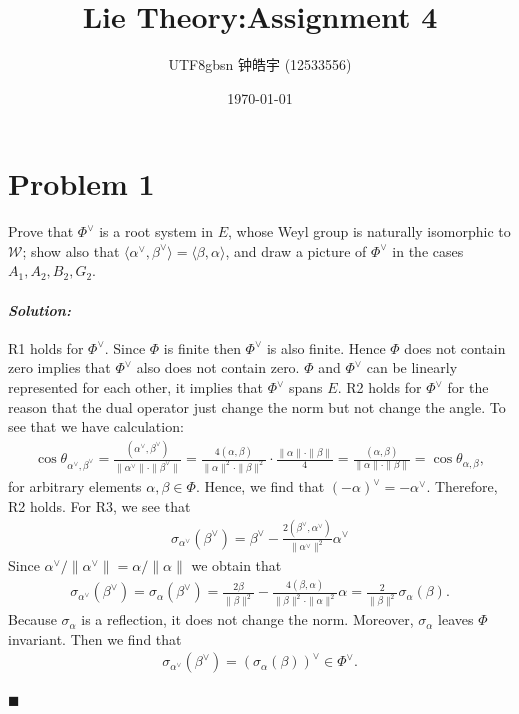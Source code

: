 \documentclass[12pt, a4paper]{article}
\title{Lie Theory:Assignment 4}
\author{
    \begin{CJK*}{UTF8}{gbsn}
    钟皓宇 (12533556)
    \end{CJK*}
}
\date{\today}
\newenvironment{solution}
  {\paragraph{\textit{Solution:}}\par\medskip}
  {\hfill$\blacksquare$\vspace{0.1cm}}
\begin{document}
\maketitle


\section*{Problem 1}
Prove that $\Phi^\vee$ is a root system in $E$, whose Weyl group is naturally isomorphic to $\mathcal{W}$; show also that $\langle \alpha^\vee, \beta^\vee \rangle = \langle \beta, \alpha \rangle$, and draw a picture of $\Phi^\vee$ in the cases $A_1, A_2, B_2, G_2$.
\begin{solution}
  R1 holds for $\Phi^\vee$.
  Since $\Phi$ is finite then $\Phi^\vee$ is also finite. Hence $\Phi$ does not contain zero implies that $\Phi^\vee$ also does not contain zero.
  $\Phi$ and $\Phi^\vee$ can be linearly represented for each other, it implies that $\Phi^\vee$ spans $E$.
  R2 holds for $\Phi^\vee$ for the reason that the dual operator just change the norm but not change the angle. To see that we have calculation:
  \begin{align*}
    \cos\theta_{\alpha^\vee,\beta^\vee}= \frac{(\alpha^\vee,\beta^\vee)}{\|\alpha^\vee\|\cdot \|\beta^\vee\|} = \frac{4(\alpha,\beta)}{\|\alpha\|^2\cdot \|\beta\|^2}\cdot \frac{\|\alpha\|\cdot \|\beta\|}{4} =\frac{(\alpha,\beta)}{\|\alpha\|\cdot \|\beta\|}=  \cos\theta_{\alpha,\beta},
  \end{align*}
  for arbitrary elements $\alpha,\beta\in \Phi$. Hence, we find that $(-\alpha)^\vee=-\alpha^\vee$.
  Therefore, R2 holds.
  For R3, we see that 
  \begin{align*}
    \sigma_{\alpha^\vee}(\beta^\vee) = \beta^\vee -\frac{2(\beta^\vee,\alpha^\vee)}{\|\alpha^\vee\|^2}\alpha^\vee 
  \end{align*}
  Since $\alpha^\vee/\|\alpha^\vee\|=\alpha/\|\alpha\|$ we obtain that 
  \begin{align*}
     \sigma_{\alpha^\vee}(\beta^\vee) = \sigma_{\alpha}(\beta^\vee)=\frac{2\beta}{\|\beta\|^2} - \frac{4(\beta,\alpha)}{\|\beta\|^2 \cdot \|\alpha\|^2} \alpha = \frac{2}{\|\beta\|^2}\sigma_{\alpha}(\beta).
  \end{align*}
  Because $\sigma_{\alpha}$ is a reflection, it does not change the norm. Moreover, $\sigma_\alpha$ leaves $\Phi$ invariant. Then we find that 
  \begin{align*}
    \sigma_{\alpha^\vee}(\beta^\vee) = (\sigma_\alpha(\beta))^\vee \in \Phi^\vee.
  \end{align*} 

\end{solution}
\end{document}
